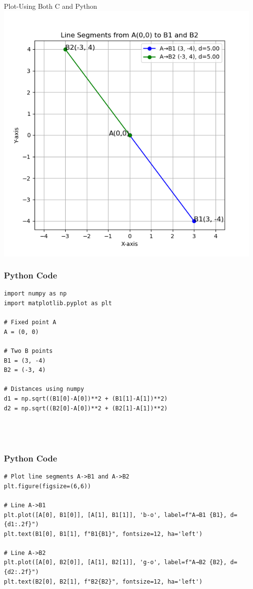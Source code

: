 \documentclass{beamer}
\begin{document}
\begin{frame}{Plot-Using Both C and Python}
    \centering
    \includegraphics[width=\columnwidth, height=0.8\textheight, keepaspectratio]{figs/distance.png}     
\end{frame}

\begin{frame}[fragile]
    \frametitle{Python Code}
    \begin{lstlisting}
import numpy as np
import matplotlib.pyplot as plt

# Fixed point A
A = (0, 0)

# Two B points
B1 = (3, -4)
B2 = (-3, 4)

# Distances using numpy
d1 = np.sqrt((B1[0]-A[0])**2 + (B1[1]-A[1])**2)
d2 = np.sqrt((B2[0]-A[0])**2 + (B2[1]-A[1])**2)




\end{lstlisting}
\end{frame}

\begin{frame}[fragile]
    \frametitle{Python Code }
    \begin{lstlisting}
# Plot line segments A->B1 and A->B2
plt.figure(figsize=(6,6))

# Line A->B1
plt.plot([A[0], B1[0]], [A[1], B1[1]], 'b-o', label=f"A→B1 {B1}, d={d1:.2f}")
plt.text(B1[0], B1[1], f"B1{B1}", fontsize=12, ha='left')

# Line A->B2
plt.plot([A[0], B2[0]], [A[1], B2[1]], 'g-o', label=f"A→B2 {B2}, d={d2:.2f}")
plt.text(B2[0], B2[1], f"B2{B2}", fontsize=12, ha='left')


\end{lstlisting}
\end{frame}
\end{document}
